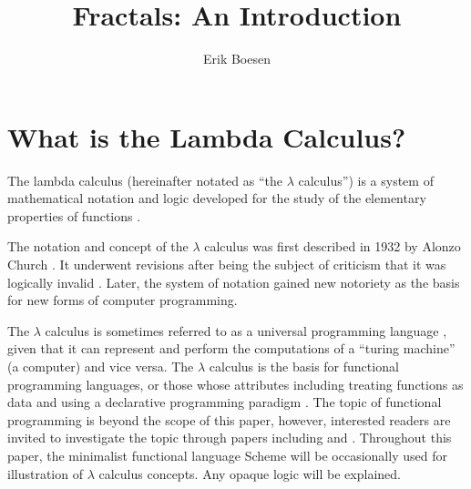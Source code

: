 \documentclass{article}
\begin{document}
\title{Fractals: An Introduction}
\author{Erik Boesen}
\maketitle

\begin{abstract}
\end{abstract}

\section{What is the Lambda Calculus?}
The lambda calculus (hereinafter notated as ``the $\lambda$ calculus'') is a system of mathematical notation and logic developed for the study of the elementary properties of functions \cite{rojastutorial}.

The notation and concept of the $\lambda$ calculus was first described in 1932 by Alonzo Church \cite{church}. It underwent revisions after being the subject of criticism that it was logically invalid \cite{church2}. Later, the system of notation gained new notoriety as the basis for new forms of computer programming.

The $\lambda$ calculus is sometimes referred to as a universal programming language \cite{rojastutorial}, given that it can represent and perform the computations of a ``turing machine'' (a computer) and vice versa. The $\lambda$ calculus is the basis for functional programming languages, or those whose attributes including treating functions as data and using a declarative programming paradigm \cite{hudakevolution}. The topic of functional programming is beyond the scope of this paper, however, interested readers are invited to investigate the topic through papers including \cite{totalfp} and \cite{hudakevolution}. Throughout this paper, the minimalist functional language Scheme will be occasionally used for illustration of $\lambda$ calculus concepts. Any opaque logic will be explained.


\end{document}
